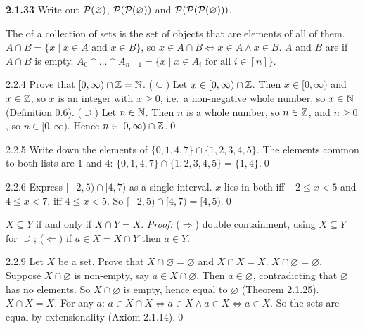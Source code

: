 \begin{trybox}[{2.1.33 \fO}]
\textbf{2.1.33} Write out $\mathcal{P}(\varnothing)$, $\mathcal{P}(\mathcal{P}(\varnothing))$ and $\mathcal{P}(\mathcal{P}(\mathcal{P}(\varnothing)))$.
\end{trybox}


\begin{key}
The  of a collection of sets is the set of objects that are elements of all of them. $A\cap B=\{x\mid x\in A\text{ and }x\in B\}$, so $x\in A\cap B\Leftrightarrow x\in A\wedge x\in B$. $A$ and $B$ are  if $A\cap B$ is empty. $A_0\cap\dots\cap A_{n-1}=\{x\mid x\in A_i\text{ for all }i\in[n]\}$.
\end{key}

\begin{bookex}[recommended]{2.2.4}
Prove that $[0,\infty)\cap\mathbb{Z}=\mathbb{N}$.
\solution
($\subseteq$) Let $x\in[0,\infty)\cap\mathbb{Z}$. Then $x\in[0,\infty)$ and $x\in\mathbb{Z}$, so $x$ is an integer with $x\ge0$, i.e.\ a non-negative whole number, so $x\in\mathbb{N}$ (Definition 0.6). ($\supseteq$) Let $n\in\mathbb{N}$. Then $n$ is a whole number, so $n\in\mathbb{Z}$, and $n\ge0$, so $n\in[0,\infty)$. Hence $n\in[0,\infty)\cap\mathbb{Z}$.\qed
\end{bookex}

\begin{bookex}[essential]{2.2.5}
Write down the elements of $\{0,1,4,7\}\cap\{1,2,3,4,5\}$.
\solution
The elements common to both lists are $1$ and $4$: $\{0,1,4,7\}\cap\{1,2,3,4,5\}=\{1,4\}$.\qed
\end{bookex}

\begin{bookex}[recommended]{2.2.6}
Express $[-2,5)\cap[4,7)$ as a single interval.
\solution
$x$ lies in both iff $-2\le x<5$ and $4\le x<7$, iff $4\le x<5$. So $[-2,5)\cap[4,7)=[4,5)$.\qed
\end{bookex}

\begin{result}[{Proposition 2.2.8}]
$X\subseteq Y$ if and only if $X\cap Y=X$. \emph{Proof:} ($\Rightarrow$) double containment, using $X\subseteq Y$ for $\supseteq$; ($\Leftarrow$) if $a\in X=X\cap Y$ then $a\in Y$.
\end{result}

\begin{bookex}[recommended]{2.2.9}
Let $X$ be a set. Prove that $X\cap\varnothing=\varnothing$ and $X\cap X=X$.
\solution
\emph{$X\cap\varnothing=\varnothing$.} Suppose $X\cap\varnothing$ is non-empty, say $a\in X\cap\varnothing$. Then $a\in\varnothing$, contradicting that $\varnothing$ has no elements. So $X\cap\varnothing$ is empty, hence equal to $\varnothing$ (Theorem 2.1.25).\\
\emph{$X\cap X=X$.} For any $a$: $a\in X\cap X\Leftrightarrow a\in X\wedge a\in X\Leftrightarrow a\in X$. So the sets are equal by extensionality (Axiom 2.1.14).\qed
\end{bookex}

